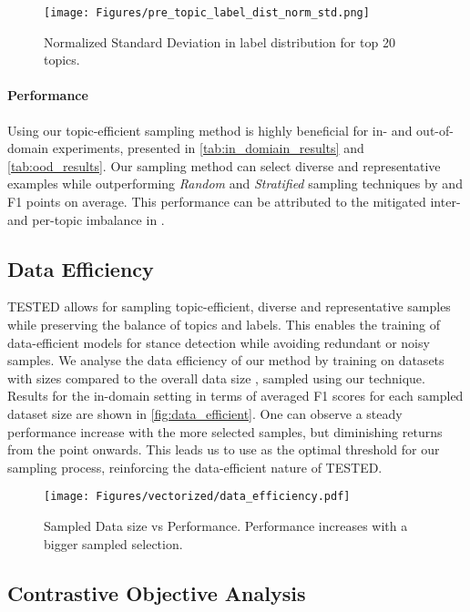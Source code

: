 \documentclass[11pt]{article}
\begin{document}
\begin{figure}[t]
\centering
\texttt{[image: Figures/pre\_topic\_label\_dist\_norm\_std.png]}
\caption{Normalized Standard Deviation in label distribution for top 20 topics.
}
\label{fig:per_topic_dist_std}
\end{figure}

\paragraph{Performance} 

Using our topic-efficient sampling method is highly beneficial for in- and out-of-domain experiments, presented in \autoref{tab:in_domiain_results} and \autoref{tab:ood_results}. Our sampling method can select diverse and representative examples while outperforming \textit{Random} and \textit{Stratified} sampling techniques by  and  F1 points on average. This performance can be attributed to the mitigated inter- and per-topic imbalance in .


\subsection{Data Efficiency}
\label{subsec:data_efficiency}

TESTED allows for sampling topic-efficient, diverse and representative samples while preserving the balance of topics and labels. This enables the training of data-efficient models for stance detection while avoiding redundant or noisy samples. We analyse the data efficiency of our method by training on datasets with sizes  compared to the overall data size , sampled using our technique. Results for the in-domain setting in terms of averaged F1 scores for each sampled dataset size are shown in \autoref{fig:data_efficient}. One can observe a steady performance increase with the more selected samples, but diminishing returns from the  point onwards. This leads us to use  as the optimal threshold for our sampling process, reinforcing the data-efficient nature of TESTED.

\begin{figure}[t]
\centering
\texttt{[image: Figures/vectorized/data\_efficiency.pdf]}
\caption{Sampled Data size vs Performance. Performance increases with a bigger sampled selection.}
\label{fig:data_efficient}
\end{figure}

\subsection{Contrastive Objective Analysis}
\label{subsec:contrastive}
\end{document}

